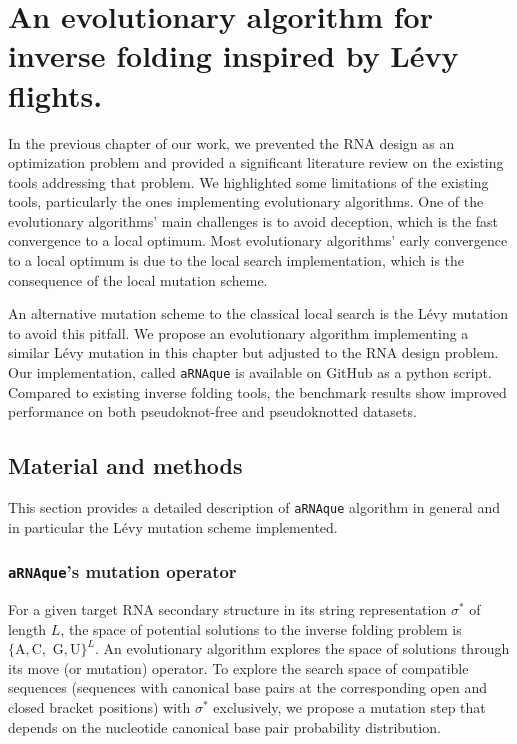 \chapter{An evolutionary algorithm for inverse folding inspired by Lévy flights.}\label{ch:arnaque}

In the previous chapter of our work, we prevented the RNA design as an optimization problem and provided a significant literature review on the existing tools addressing that problem. We highlighted some limitations of the existing tools, particularly the ones implementing evolutionary algorithms. One of the evolutionary algorithms' main challenges is to avoid deception, which is the fast convergence to a local optimum. Most evolutionary algorithms' early convergence to a local optimum is due to the local search implementation, which is the consequence of the local mutation scheme. 

An alternative mutation scheme to the classical local search is the Lévy mutation to avoid this pitfall. We propose an evolutionary algorithm implementing a similar Lévy mutation in this chapter but adjusted to the RNA design problem. Our implementation, called \texttt{aRNAque} is available on GitHub as a python script. Compared to existing inverse folding tools, the benchmark results show improved performance on both pseudoknot-free and pseudoknotted datasets.
	
\section{Material and methods}

This section provides a detailed description of \texttt{aRNAque} algorithm in general and in particular the Lévy mutation scheme implemented. 

\subsection{\texttt{aRNAque}'s mutation operator}

For a given target RNA secondary structure in its string representation $\sigma^*$ of length $L$, the space of potential solutions to the inverse folding problem is $\{\text{A},\text{C},\text{ G}, \text{U}\}^L$.
An evolutionary algorithm explores the space of solutions through its move (or mutation) operator. To explore the search space of compatible sequences (sequences with canonical base pairs at the corresponding open and closed bracket positions) with $\sigma^*$ exclusively, we propose a mutation step that depends on the nucleotide canonical base pair probability distribution.

